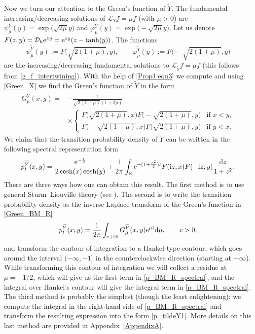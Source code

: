 \documentclass[pdftex]{sigma}
\numberwithin{equation}{section}
\theoremstyle{definition}
\def\L{{\mathcal L}}
\def\r{{\mathbb R}}
\def\wr{{\textnormal{Wr}}}
\def\d{{\textnormal d}}
\def\i{{\textnormal i}}
\begin{document}
Now we turn our attention to the Green's function of $\widetilde Y$. The fundamental increasing/de\-creas\-ing solutions of $\L_Y f= \mu f$ (with $\mu>0$) are $\psi_{\mu}^Y(y)=\exp\bigl(\sqrt{2\mu} y\bigr)$ and
$\varphi_{\mu}^Y(y)=\exp\bigl(-\sqrt{2\mu} y\bigr)$. Let us denote
$
F(z,y)={\mathcal D}_h {\rm e}^{z y}={\rm e}^{zy} (z-\tanh(y))$.
The functions
\[
\psi_{\mu}^{\widetilde Y}(y):=F\bigl(\sqrt{2(1+\mu)},y\bigr), \qquad \varphi_{\mu}^{\widetilde Y}(y)
:=F\bigl(-\sqrt{2(1+\mu)},y\bigr)
\]
are the increasing/decreasing fundamental solutions to $\L_{\widetilde Y} f=\mu f$ (this follows from \eqref{g_f_intertwining}). With the help of
 \eqref{Prop1:eqn3} we compute \smash{$\wr\big[ \varphi_{\mu}^{\widetilde Y}; \psi_{\mu}^{\widetilde Y}\big]=-
2(1+2\mu)\sqrt{2(1+\mu)}$} and using \eqref{Green_X} we find the Green's function of $\widetilde Y$ in the form
\begin{align}
G^{\widetilde Y}_{\mu}(x,y)={}&-\frac{1}{\sqrt{2(1+\mu)}(1+2\mu)} \nonumber\\
&\times
\begin{cases}
F\bigl(\sqrt{2(1+\mu)},x\bigr) F\bigl(-\sqrt{2(1+\mu)},y\bigr)  &\text{if }  x<y,\\
F\bigl(-\sqrt{2(1+\mu)},x\bigr) F\bigl(\sqrt{2(1+\mu)},y\bigr)  &\text{if }  y<x.
\end{cases}\label{Green_BM_R}
\end{align}
We claim that the transition probability density of $\widetilde Y$ can be written in the following spectral representation form
\begin{equation}\label{p_BM_R_spectral}
 p^{\widetilde Y}_t(x,y)= \frac{{\rm e}^{-\frac{t}{2}}}{2\cosh(x) \cosh(y)} + \frac{1}{2\pi} \int_{\r} {\rm e}^{-(1+\frac{z^2}{2})t}
F(\i z,x) F(-\i z, y) \frac{\d z}{1+z^2}.
\end{equation}
There are three ways how one can obtain this result. The first method is to use general Sturm--Liouville theory (see \cite[Section 2.2]{sousa-yakubovich2022convolution}). The second is to write the transition probability density as the inverse Laplace transform of the Green's function in
\eqref{Green_BM_R}
\[
p^{\widetilde Y}_t(x,y)=\frac{1}{2\pi }
\int_{c+\i \r} G^{\widetilde Y}_{\mu}(x,y) {\rm e}^{\mu t} \d \mu, \qquad c>0,
\]
and transform the contour of integration to a Hankel-type contour, which goes around the interval $(-\infty,-1]$ in the counterclockwise direction (starting at $-\infty$). While transforming this contour of integration we will collect a residue at $\mu=-1/2$, which will give us the first term in \eqref{p_BM_R_spectral}, and the integral over Hankel's contour will give the integral term in \eqref{p_BM_R_spectral}. The third method is probably the simplest (though the least enlightening): we compute the integral in the right-hand side of \eqref{p_BM_R_spectral} and transform the resulting expression into the form
\eqref{p_tildeY1}. More details on this last method are provided in Appendix~\ref{AppendixA}.
\end{document}
